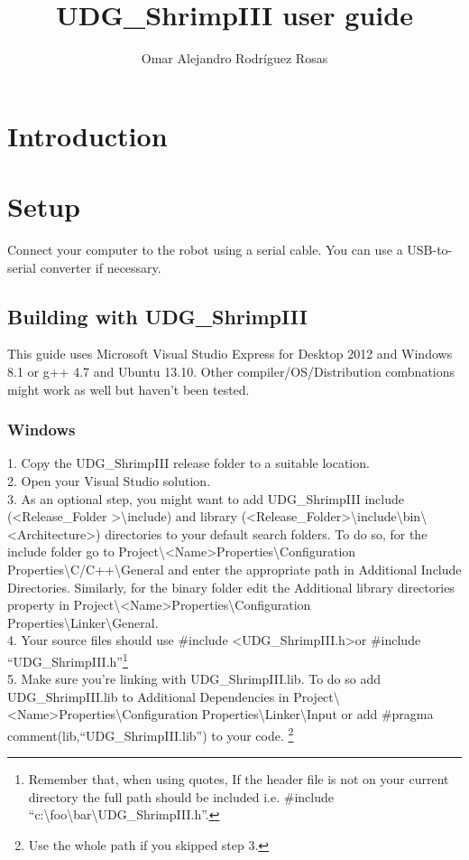 \documentclass{book}
\title{UDG\_ShrimpIII user guide}
\author{Omar Alejandro Rodr\'{i}guez Rosas}
\begin{document}
\maketitle
\tableofcontents
\chapter{Introduction}
\chapter{Setup}
Connect your computer to the robot using a serial cable. You can use a USB-to-serial converter if necessary.\\
\section{Building with UDG\_ShrimpIII}
This guide uses Microsoft Visual Studio Express for Desktop 2012 and Windows 8.1 or g++ 4.7 and Ubuntu 13.10. Other compiler/OS/Distribution combnations might work as well but haven't been tested.\\
\subsection{Windows}
1. Copy the UDG\_ShrimpIII release folder to a suitable location.\\
2. Open your Visual Studio solution.\\
3. As an optional step, you might want to add UDG\_ShrimpIII include (\textless{}Release\_Folder \textgreater\textbackslash{include}) and library (\textless{}Release\_Folder\textgreater\textbackslash{include}\textbackslash{bin}\textbackslash{\textless{}Architecture\textgreater}) directories to your default search folders. To do so, for the include folder go to Project\textbackslash{\textless{}Name\textgreater Properties}\textbackslash{Configuration Properties}\textbackslash{C/C++}\textbackslash{General} and enter the appropriate path in Additional Include Directories. Similarly, for the binary folder edit the Additional library directories property in  Project\textbackslash{\textless{}Name\textgreater{}Properties}\textbackslash{Configuration Properties}\textbackslash{Linker}\textbackslash{General}.\\
4. Your source files should use \#include \textless UDG\_ShrimpIII.h\textgreater or \#include ``UDG\_ShrimpIII.h''\footnote{Remember that, when using quotes, If the header file is not on your current directory the full path should be included i.e. \#include ``c:\textbackslash{}foo\textbackslash{}bar\textbackslash{}UDG\_ShrimpIII.h''.}\\
5. Make sure you're linking with UDG\_ShrimpIII.lib. To do so add UDG\_ShrimpIII.lib to Additional Dependencies in Project\textbackslash{\textless{}Name\textgreater{}Properties}\textbackslash{Configuration Properties}\textbackslash{Linker}\textbackslash{Input} or add \#pragma comment(lib,``UDG\_ShrimpIII.lib'') to your code. \footnote{Use the whole path if you skipped step 3.}\\
 
\end{document}
